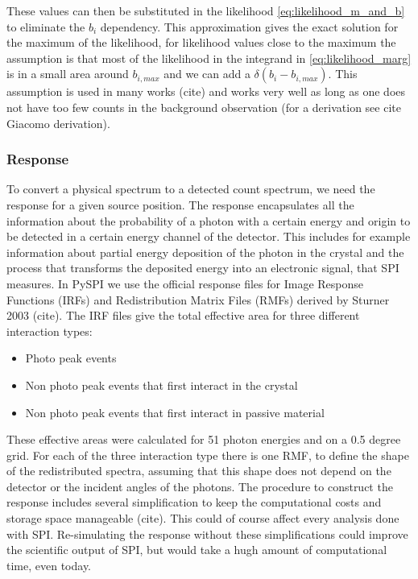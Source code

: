 \documentclass[modern]{aastex631}
\begin{document}
These values can then be substituted in the likelihood \ref{eq:likelihood_m_and_b} to eliminate the $b_{i}$ dependency. This approximation gives the exact solution for the maximum of the likelihood, for likelihood values close to the maximum the assumption is that most of the likelihood in the integrand in \ref{eq:likelihood_marg} is in a small area around $b_{i,max}$ and we can add a $\delta(b_{i}-b_{{i,max}})$. This assumption is used in many works (cite) and works very well as long as one does not have too few counts in the background observation (for a derivation see cite Giacomo derivation).

\subsubsection*{Response}

To convert a physical spectrum to a detected count spectrum, we need the response for a given source position. The response encapsulates all the information about the probability of a photon with a certain energy and origin to be detected in a certain energy channel of the detector. This includes for example information about partial energy deposition of the photon in the crystal and the process that transforms the deposited energy into an electronic signal, that SPI measures.
In PySPI we use the official response files for Image Response Functions (IRFs) and Redistribution Matrix Files (RMFs) derived by Sturner 2003 (cite). The IRF files give the total effective area for three different interaction types:
\begin{itemize}
  \item Photo peak events
  \item Non photo peak events that first interact in the crystal
  \item Non photo peak events that first interact in passive material
\end{itemize}

These effective areas were calculated for 51 photon energies and on a 0.5 degree grid. For each of the three interaction type there is one RMF, to define the shape of the redistributed spectra, assuming that this shape does not depend on the detector or the incident angles of the photons.
The procedure to construct the response includes several simplification to keep the computational costs and storage space manageable (cite). This could of course affect every analysis done with SPI. Re-simulating the response without these simplifications could improve the scientific output of SPI, but would take a hugh amount of computational time, even today.
\end{document}
